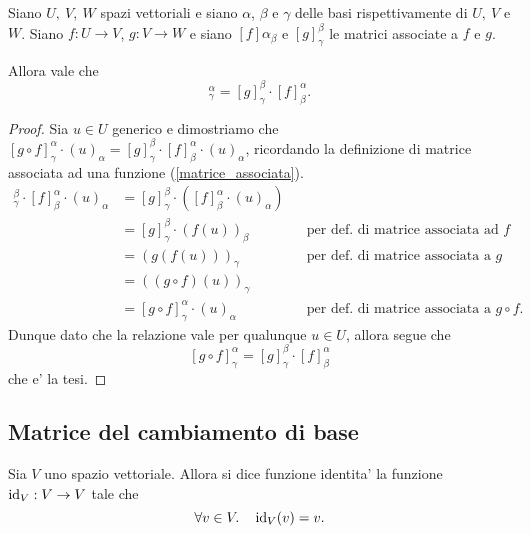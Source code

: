 \begin{theorem}
    Siano $U,\ V,\ W$ spazi vettoriali e siano $\alpha$, $\beta$ e $\gamma$ delle basi rispettivamente di $U,\ V$ e $W$. Siano $f : U \to V$, $g : V \to W$ e siano $[f]{\alpha}_{\beta}$ e $[g]^{\beta}_{\gamma}$ le matrici associate a $f$ e $g$.

    Allora vale che \begin{equation}
        [g \circ f]^{\alpha}_{\gamma} = [g]^{\beta}_{\gamma} \cdot [f]^{\alpha}_{\beta}.
    \end{equation}
\end{theorem}
\begin{proof}
    Sia $u \in U$ generico e dimostriamo che $[g \circ f]^{\alpha}_{\gamma} \cdot (u)_{\alpha} = [g]^{\beta}_{\gamma} \cdot [f]^{\alpha}_{\beta} \cdot (u)_{\alpha}$, ricordando la definizione di matrice associata ad una funzione (\ref{matrice_associata}).
    \begin{align*}
        [g]^{\beta}_{\gamma} \cdot [f]^{\alpha}_{\beta} \cdot (u)_{\alpha} &= [g]^{\beta}_{\gamma} \cdot ([f]^{\alpha}_{\beta} \cdot (u)_{\alpha}) \\
        &= [g]^{\beta}_{\gamma} \cdot (f(u))_{\beta} &&\text{per def. di matrice associata ad $f$}\\
        &= (g(f(u)))_{\gamma} &&\text{per def. di matrice associata a $g$}\\
        &= ((g \circ f)(u))_{\gamma}\\
        &= [g \circ f]^{\alpha}_{\gamma} \cdot (u)_{\alpha} &&\text{per def. di matrice associata a $g \circ f$.}
    \end{align*}
    Dunque dato che la relazione vale per qualunque $u \in U$, allora segue che \[
        [g \circ f]^{\alpha}_{\gamma} = [g]^{\beta}_{\gamma} \cdot [f]^{\alpha}_{\beta}    
    \] che e' la tesi.
\end{proof}

\subsection{Matrice del cambiamento di base}

\begin{definition}
    Sia $V$ uno spazio vettoriale. Allora si dice funzione identita' la funzione $\operatorname{id}_V : V \to V$ tale che \[
        \forall v \in V. \quad \operatorname{id}_V(v) = v.
    \]
\end{definition}

